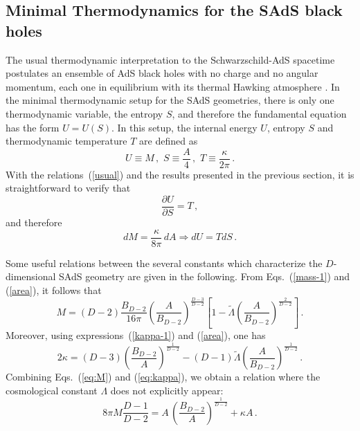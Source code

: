 \documentclass[prd,onecolumn,notitlepage,amsmath,nofootinbib,superscriptaddress,showpacs,showkeys]{revtex4-1}
\begin{document}
\subsection{\label{sub:Minimal-Thermodynamics-for}Minimal Thermodynamics for
the SAdS black holes}

The usual thermodynamic interpretation to the Schwarzschild-AdS spacetime
postulates an ensemble of AdS black holes with no charge and no angular
momentum, each one in equilibrium with its thermal Hawking atmosphere
\cite{wald,nat2015}. In the minimal thermodynamic setup for the
SAdS geometries, there is only one thermodynamic variable, the entropy
$S$, and therefore the fundamental equation has the form $U=U\left(S\right)$.
In this setup, the internal energy $U$, entropy $S$ and thermodynamic
temperature $T$ are defined as 
\begin{equation}
U\equiv M\,,\,\, S\equiv\frac{A}{4}\,,\,\, T\equiv\frac{\kappa}{2\pi}\,.\label{usual}
\end{equation}
With the relations~(\ref{usual}) and the results presented in the
previous section, it is straightforward to verify that 
\begin{equation}
\frac{\partial U}{\partial S}=T\,,\label{duds}
\end{equation}
and therefore 
\begin{equation}
dM=\frac{\kappa}{8\pi}\, dA\Rightarrow dU=TdS\,.\label{dm}
\end{equation}


Some useful relations between the several constants which characterize
the $D$-dimensional SAdS geometry are given in the following. From
Eqs.~(\ref{mass-1}) and (\ref{area}), it follows that 
\begin{equation}
M=\left(D-2\right)\frac{B_{D-2}}{16\pi}\left(\frac{A}{B_{D-2}}\right)^{\frac{D-3}{D-2}}\left[1-\tilde{\Lambda}\left(\frac{A}{B_{D-2}}\right)^{\frac{2}{D-2}}\right]\,.\label{eq:M}
\end{equation}
Moreover, using expressions~(\ref{kappa-1}) and (\ref{area}), one
has 
\begin{equation}
2\kappa=\left(D-3\right)\left(\frac{B_{D-2}}{A}\right)^{\frac{1}{D-2}}-\left(D-1\right)\tilde{\Lambda}\left(\frac{A}{B_{D-2}}\right)^{\frac{1}{D-2}}\,.\label{eq:kappa}
\end{equation}
Combining Eqs.~(\ref{eq:M}) and (\ref{eq:kappa}), we obtain a relation
where the cosmological constant $\Lambda$ does not explicitly appear:
\begin{equation}
8\pi M\frac{D-1}{D-2}=A\,\left(\frac{B_{D-2}}{A}\right)^{\frac{1}{D-2}}+\kappa A\,.\label{eq_no_Lambda}
\end{equation}
\end{document}
